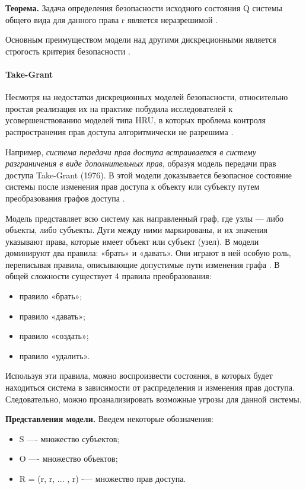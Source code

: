 \textbf{Теорема.} Задача определения безопасности исходного состояния Q системы общего вида для 
данного права r является неразрешимой \autocite{WikiHRU}.

Основным преимуществом модели над другими дискреционными является строгость критерия безопасности \autocite{WikiHRU}.

\paragraph{Take-Grant}

Несмотря на недостатки дискреционных моделей безопасности, относительно простая реализация их на практике побудила 
исследователей к усовершенствованию моделей типа HRU, в которых проблема контроля распространения прав доступа 
алгоритмически не разрешима \autocite{URFULecture10Models}.

Например, \textit{система передачи прав доступа встраивается в систему разграничения в виде дополнительных прав}, образуя 
модель передачи прав доступа Take-Grant (1976). В этой модели доказывается безопасное состояние системы после 
изменения прав доступа к объекту или субъекту путем преобразования графов доступа \autocite{URFULecture10Models}.

Модель представляет всю систему как направленный граф, где узлы — либо объекты, либо субъекты. Дуги между ними 
маркированы, и их значения указывают права, которые имеет объект или субъект (узел). В модели доминируют два правила: 
«брать» и «давать». Они играют в ней особую роль, переписывая правила, описывающие допустимые пути изменения графа \autocite{WikiTakeGrant}. 
В общей сложности существует 4 правила преобразования:
\begin{itemize}
    \item правило «брать»;
    \item правило «давать»;
    \item правило «создать»;
    \item правило «удалить».
\end{itemize}
Используя эти правила, можно воспроизвести состояния, в которых будет находиться система в зависимости от распределения 
и изменения прав доступа. Следовательно, можно проанализировать возможные угрозы для данной системы.

\textbf{Представления модели.} Введем некоторые обозначения:
\begin{itemize}
    \item S —- множество субъектов;
    \item O —- множество объектов;
    \item R = (r, r, ... , r) -— множество прав доступа.
\end{itemize}

